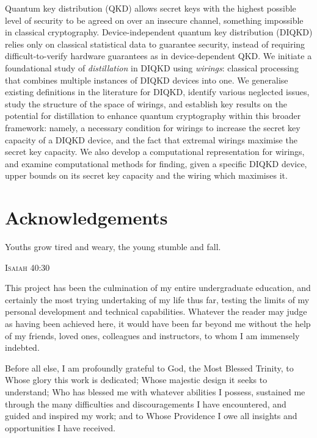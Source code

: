 \documentclass[10pt, a4paper]{article}
\numberwithin{equation}{section} %
\theoremstyle{definition}
\theoremstyle{plain}
\newcommand{\?}{\mathrel{?}} %
\begin{document}
    Quantum key distribution (QKD) allows secret keys with the highest possible level of security to be agreed on over an insecure channel, something impossible in classical cryptography. Device-independent quantum key distribution (DIQKD) relies only on classical statistical data to guarantee security, instead of requiring difficult-to-verify hardware guarantees as in device-dependent QKD\@. We initiate a foundational study of \emph{distillation} in DIQKD using \emph{wirings}: classical processing that combines multiple instances of DIQKD devices into one. We generalise existing definitions in the literature for DIQKD, identify various neglected issues, study the structure of the space of wirings, and establish key results on the potential for distillation to enhance quantum cryptography within this broader framework: namely, a necessary condition for wirings to increase the secret key capacity of a DIQKD device, and the fact that extremal wirings maximise the secret key capacity. We also develop a computational representation for wirings, and examine computational methods for finding, given a specific DIQKD device, upper bounds on its secret key capacity and the wiring which maximises it.

    \clearpage

    \section*{Acknowledgements}
    \epigraph{Youths grow tired and weary, the young stumble and fall.}{\textsc{Isaiah} 40:30}

    This project has been the culmination of my entire undergraduate education, and certainly the most trying undertaking of my life thus far, testing the limits of my personal development and technical capabilities. Whatever the reader may judge as having been achieved here, it would have been far beyond me without the help of my friends, loved ones, colleagues and instructors, to whom I am immensely indebted.

    Before all else, I am profoundly grateful to God, the Most Blessed Trinity, to Whose glory this work is dedicated; Whose majestic design it seeks to understand; Who has blessed me with whatever abilities I possess, sustained me through the many difficulties and discouragements I have encountered, and guided and inspired my work; and to Whose Providence I owe all insights and opportunities I have received.
\end{document}
